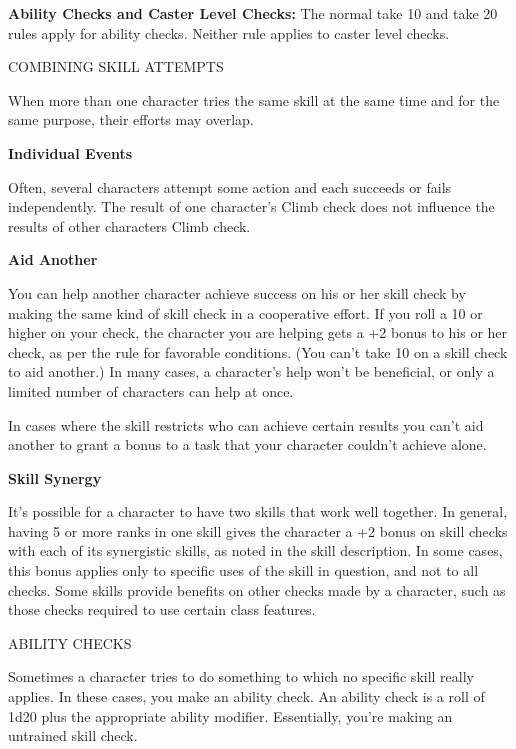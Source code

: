 \documentclass{article}
\begin{document}
\textbf{Ability Checks and Caster Level Checks:} The normal take 10 and take 20 
rules apply for ability checks. Neither rule applies to caster level checks.

\vspace{12pt}
COMBINING SKILL ATTEMPTS

When more than one character tries the same skill at the same time and for the 
same purpose, their efforts may overlap.

\vspace{12pt}
\textbf{Individual Events}

Often, several characters attempt some action and each succeeds or fails independently. 
 The result of one character's Climb check does not influence the results of other 
characters Climb check.

\vspace{12pt}
\textbf{Aid Another}

You can help another character achieve success on his or her skill check by making 
the same kind of skill check in a cooperative effort. If you roll a 10 or higher 
on your check, the character you are helping gets a +2 bonus to his or her check, 
as per the rule for favorable conditions. (You can't take 10 on a skill check to 
aid another.) In many cases, a character's help won't be beneficial, or only a 
limited number of characters can help at once. 

In cases where the skill restricts who can achieve certain results you can't aid 
another to grant a bonus to a task that your character couldn't achieve alone.

\vspace{12pt}
\textbf{Skill Synergy}

It's possible for a character to have two skills that work well together. In general, 
having 5 or more ranks in one skill gives the character a +2 bonus on skill checks 
with each of its synergistic skills, as noted in the skill description. In some 
cases, this bonus applies only to specific uses of the skill in question, and not 
to all checks. Some skills provide benefits on other checks made by a character, 
such as those checks required to use certain class features.

\vspace{12pt}
ABILITY CHECKS

Sometimes a character tries to do something to which no specific skill really applies. 
In these cases, you make an ability check. An ability check is a roll of 1d20 plus 
the appropriate ability modifier. Essentially, you're making an untrained skill 
check. 
\end{document}
